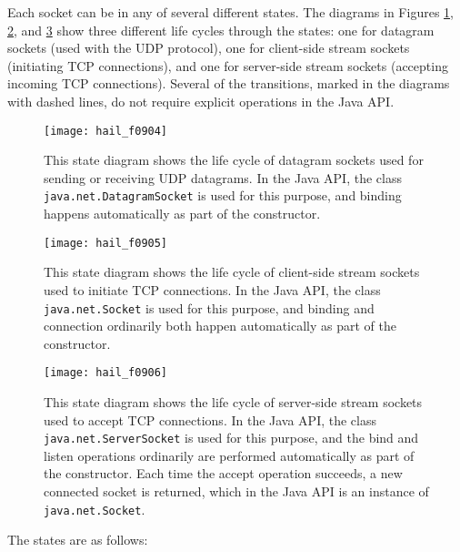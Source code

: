 Each socket can be in any of several different states.  The diagrams
in Figures \ref{scan-9-3}, \ref{scan-9-4}, and \ref{scan-9-5} show
three different life cycles through the states: one for datagram
sockets (used with the UDP protocol), one for client-side stream
sockets (initiating TCP connections), and one for server-side stream
sockets (accepting incoming TCP connections).  Several of the
transitions, marked in the diagrams with dashed lines, do not require
explicit operations in the Java API.
\begin{figure}
\centerline{\texttt{[image: hail\_f0904]}}
\caption{This state diagram shows the life cycle of datagram sockets used for sending or receiving UDP
  datagrams.  In the Java API, the class {\tt java.net.DatagramSocket} is
  used for this purpose, and binding happens automatically as part of
  the constructor.}
\label{scan-9-3}
\end{figure}
\begin{figure}
\centerline{\texttt{[image: hail\_f0905]}}
\caption{This state diagram shows the life cycle of client-side stream
  sockets used to initiate TCP connections.
  In the Java API, the class {\tt java.net.Socket} is used for this purpose,
  and binding and connection ordinarily both happen automatically as
  part of the constructor.}
\label{scan-9-4}
\end{figure}
\begin{figure}
\centerline{\texttt{[image: hail\_f0906]}}
\caption{This state diagram shows the life cycle of server-side stream
  sockets used to accept TCP
  connections.  In the Java API, the class {\tt java.net.ServerSocket} is
  used for this purpose, and the bind and listen operations ordinarily
  are performed automatically as part of the constructor.  Each time
  the accept operation succeeds, a new connected socket is returned,
  which in the Java API is an instance of {\tt java.net.Socket}.}
\label{scan-9-5}
\end{figure}
The states are as follows:
